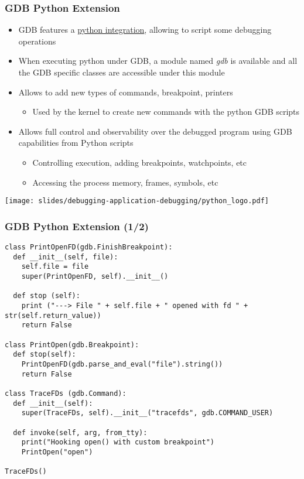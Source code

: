\begin{frame}
  \frametitle{GDB Python Extension}
  \begin{itemize}
    \item GDB features a \href{https://sourceware.org/gdb/onlinedocs/gdb/Python.html}{python integration},
          allowing to script some debugging operations
    \item When executing python under GDB, a module named {\em gdb} is available
          and all the GDB specific classes are accessible under this module
    \item Allows to add new types of commands, breakpoint, printers
    \begin{itemize}
      \item Used by the kernel to create new commands with the python GDB scripts
    \end{itemize}
    \item Allows full control and observability over the debugged program using
          GDB capabilities from Python scripts
    \begin{itemize}
      \item Controlling execution, adding breakpoints, watchpoints, etc
      \item Accessing the process memory, frames, symbols, etc
    \end{itemize}
  \end{itemize}
  \begin{center}
    \texttt{[image: slides/debugging-application-debugging/python\_logo.pdf]}
  \end{center}
\end{frame}

\begin{frame}[fragile]
  \frametitle{GDB Python Extension (1/2)}
  \begin{block}{}
    \begin{verbatim}
class PrintOpenFD(gdb.FinishBreakpoint):
  def __init__(self, file):
    self.file = file
    super(PrintOpenFD, self).__init__()

  def stop (self):
    print ("---> File " + self.file + " opened with fd " + str(self.return_value))
    return False

class PrintOpen(gdb.Breakpoint):
  def stop(self):
    PrintOpenFD(gdb.parse_and_eval("file").string())
    return False

class TraceFDs (gdb.Command):
  def __init__(self):
    super(TraceFDs, self).__init__("tracefds", gdb.COMMAND_USER)

  def invoke(self, arg, from_tty):
    print("Hooking open() with custom breakpoint")
    PrintOpen("open")

TraceFDs()
    \end{verbatim}
  \end{block}
\end{frame}


